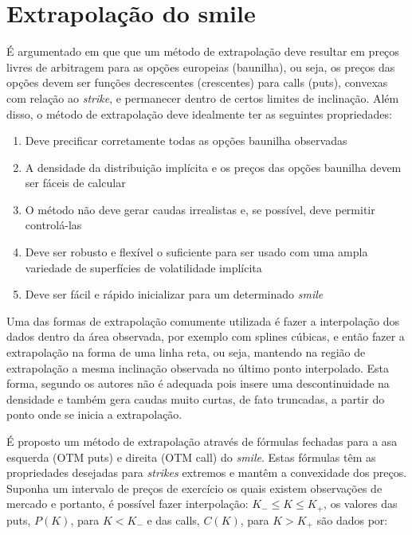 \documentclass[]{book}
\providecommand{\tightlist}{%
  \setlength{\itemsep}{0pt}\setlength{\parskip}{0pt}}
\theoremstyle{definition}
\theoremstyle{definition}
\theoremstyle{definition}
\theoremstyle{remark}
\begin{document}
\section{Extrapolação do smile}\label{extrapolacao-do-smile}

É argumentado em \citet{Benaim2008} que que um método de extrapolação
deve resultar em preços livres de arbitragem para as opções europeias
(baunilha), ou seja, os preços das opções devem ser funções decrescentes
(crescentes) para calls (puts), convexas com relação ao \emph{strike}, e
permanecer dentro de certos limites de inclinação. Além disso, o método
de extrapolação deve idealmente ter as seguintes propriedades:

\begin{enumerate}
\def\labelenumi{\arabic{enumi}.}
\tightlist
\item
  Deve precificar corretamente todas as opções baunilha observadas
\item
  A densidade da distribuição implícita e os preços das opções baunilha
  devem ser fáceis de calcular
\item
  O método não deve gerar caudas irrealistas e, se possível, deve
  permitir controlá-las
\item
  Deve ser robusto e flexível o suficiente para ser usado com uma ampla
  variedade de superfícies de volatilidade implícita
\item
  Deve ser fácil e rápido inicializar para um determinado \emph{smile}
\end{enumerate}

Uma das formas de extrapolação comumente utilizada é fazer a
interpolação dos dados dentro da área observada, por exemplo com splines
cúbicas, e então fazer a extrapolação na forma de uma linha reta, ou
seja, mantendo na região de extrapolação a mesma inclinação observada no
último ponto interpolado. Esta forma, segundo os autores não é adequada
pois insere uma descontinuidade na densidade e também gera caudas muito
curtas, de fato truncadas, a partir do ponto onde se inicia a
extrapolação.

É proposto um método de extrapolação através de fórmulas fechadas para a
asa esquerda (OTM puts) e direita (OTM call) do \emph{smile}. Estas
fórmulas têm as propriedades desejadas para \emph{strikes} extremos e
mantêm a convexidade dos preços. Suponha um intervalo de preços de
exercício os quais existem observações de mercado e portanto, é possível
fazer interpolação: \(K_-\leq K \leq K_+\), os valores das puts,
\(P(K)\), para \(K<K_-\) e das calls, \(C(K)\), para \(K>K_+\) são dados
por:
\end{document}
